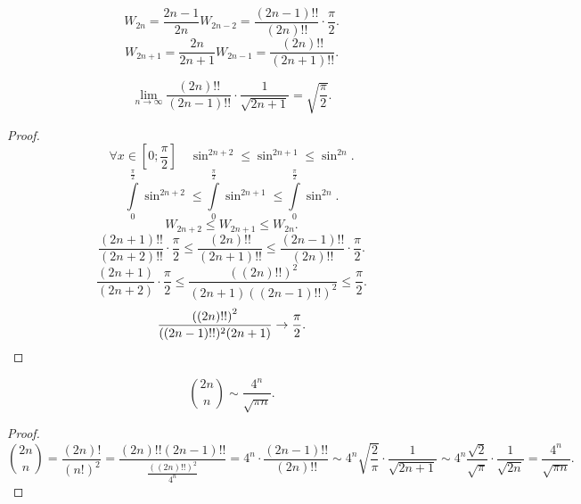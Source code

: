 \documentclass[11pt, oneside]{article}   	%
\begin{document}
\begin{dlemma}
    \[ W_{2n} = \frac{2n-1}{2n}W_{2n-2} = \frac{(2n-1)!!}{(2n)!!} \cdot  \frac{\pi}{2} .\]
    \[ W_{2n+1} = \frac{2n}{2n+1} W_{2n-1} = \frac{(2n)!!}{(2n+1)!!} .\] 
\end{dlemma}
\begin{dlemma}
    \[ \lim\limits_{n \to \infty} \frac{(2n)!!}{(2n-1)!!} \cdot \frac{1}{\sqrt{2n+1} } = \sqrt{\frac{\pi}{2}}  .\]
    \begin{proof}
        \[\forall{x\in \left[0; \frac{\pi}{2}\right]}\quad \sin^{2n+2} \le\sin^{2n+1} \le\sin^{2n} .\]
        \[ \int\limits_{0}^{\frac{\pi}{2}} \sin^{2n+2} \le \int\limits_{0}^{\frac{\pi}{2}} \sin^{2n+1} \le \int\limits_{0}^{\frac{\pi}{2}}\sin^{2n}       .\]
        \[ W_{2n+2} \le W_{2n+1} \le W_{2n}.\]
        \[ \frac{(2n+1)!!}{(2n+2)!!} \cdot  \frac{\pi}{2} \le \frac{(2n)!!}{(2n+1)!!} \le  \frac{(2n-1)!!}{(2n)!!} \cdot  \frac{\pi}{2} .\]
        \[ \frac{\left( 2n+1 \right)}{(2n+2)} \cdot \frac{\pi}{2} \le \frac{((2n)!!)^2}{(2n+1)((2n-1)!!)^2} \le \frac{\pi}{2}.\] 
        \[ \frac{\left( (2n)!! \right)^{2}}{((2n-1)!!)^2(2n+1)} \to \frac{\pi}{2} .\qedhere\] 
    \end{proof}
\end{dlemma}
\begin{dlemma}
    \[ \binom{2n}{n} \sim \frac{4^{n}}{\sqrt{\pi n} }.\]
    \begin{proof}
        \[ \binom{2n}{n} = \frac{(2n)!}{(n!)^2} = \frac{(2n)!!(2n-1)!!}{\frac{((2n)!!)^2}{4^{n}}} = 4^{n} \cdot \frac{(2n-1)!!}{(2n)!!} \sim 4^{n} \sqrt{\frac{2}{\pi}}\cdot \frac{1}{\sqrt{2n+1} } \sim 4^{n} \frac{\sqrt{2} }{\sqrt{\pi} } \cdot \frac{1}{\sqrt{2n} } = \frac{4^{n}}{\sqrt{\pi n} }.\] 
    \end{proof}
\end{dlemma}
\end{document}
